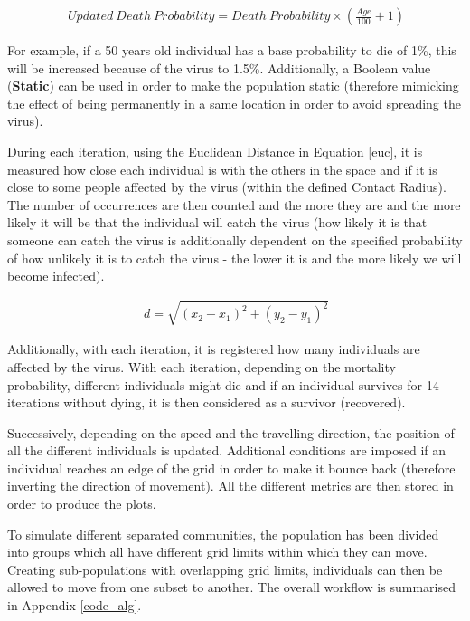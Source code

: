 \useshortskip
\begin{align}
\ Updated\:Death\:Probability = Death\:Probability \times (\frac{Age}{100} + 1) 
\end{align}
\useshortskip

For example, if a 50 years old individual has a base probability to die of 1\%, this will be increased because of the virus to 1.5\%. Additionally, a Boolean value (\textbf{Static}) can be used in order to make the population static (therefore mimicking the effect of being permanently in a same location in order to avoid spreading the virus).

During each iteration, using the Euclidean Distance in Equation \ref{euc}, it is measured how close each individual is with the others in the space and if it is close to some people affected by the virus (within the defined Contact Radius). The number of occurrences are then counted and the more they are and the more likely it will be that the individual will catch the virus (how likely it is that someone can catch the virus is additionally dependent on the specified probability of how unlikely it is to catch the virus - the lower it is and the more likely we will become infected).

\useshortskip
\begin{align}
\ d = \sqrt{(x_{2}-x_{1})^{2}+(y_{2}-y_{1})^{2}}
\label{euc}
\end{align}
\useshortskip

Additionally, with each iteration, it is registered how many individuals are affected by the virus. With each iteration, depending on the mortality probability, different individuals might die and if an individual survives for 14 iterations without dying, it is then considered as a survivor (recovered).

Successively, depending on the speed and the travelling direction, the position of all the different individuals is updated. Additional conditions are imposed if an individual reaches an edge of the grid in order to make it bounce back (therefore inverting the direction of movement). All the different metrics are then stored in order to produce the plots.

To simulate different separated communities, the population has been divided into groups which all have different grid limits within which they can move. Creating sub-populations with overlapping grid limits, individuals can then be allowed to move from one subset to another. The overall workflow is summarised in Appendix \ref{code_alg}.

